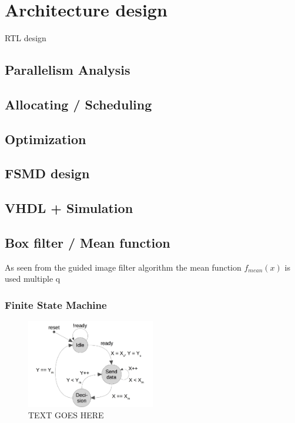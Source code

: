 \chapter{Architecture design}

RTL design
\section{Parallelism Analysis}

\section{Allocating / Scheduling}

\section{Optimization}

\section{FSMD design}

\section{VHDL + Simulation}

\section*{Box filter / Mean function}
As seen from the guided image filter algorithm the mean function $f_{mean}(x)$ is used multiple q

\subsection*{Finite State Machine}
\begin{figure}
  \centering
  \includegraphics[width=0.5\textwidth]{figures/meanFSMv1.jpg}
  \caption{TEXT GOES HERE}
  \label{fig:LABEL}
\end{figure}

